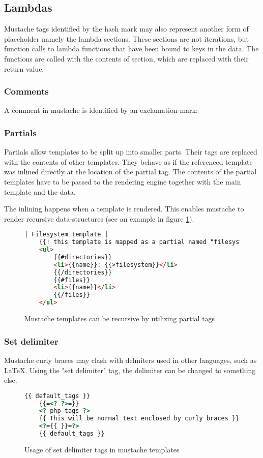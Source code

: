 \subsection{Lambdas}
Mustache tags identified by the hash mark may also represent another form of
placeholder namely the lambda sections. These sections are not iterations, but
function calls to lambda functions that have been bound to keys in the data.
The functions are called with the contents of section, which are replaced
with their return value.

\subsubsection{Comments}
A comment in mustache is identified by an exclamation mark:

\subsubsection{Partials}
Partials allow templates to be split up into smaller parts. Their tags are
replaced with the contents of other templates. They behave as if the referenced
template was inlined directly at the location of the partial tag.
The contents of the partial templates have to be passed to the rendering engine
together with the main template and the data.

The inlining happens when a template is rendered. This enables mustache to
render recursive data-structures
(see an example in figure \ref{fig:partial-example.mustache}).
\begin{figure}
	\label{fig:partial-example.mustache}
	\centering
	\caption{Mustache templates can be recursive by utilizing partial tags}
	\begin{lstlisting}[language=HTML]
	| Filesystem template |
	{{! this template is mapped as a partial named "filesystem" }}
	<ul>
		{{#directories}}
		<li>{{name}}: {{>filesystem}}</li>
		{{/directories}}
		{{#files}}
		<li>{{name}}</li>
		{{/files}}
	</ul>
	\end{lstlisting}
\end{figure}

\subsubsection{Set delimiter}
Mustache curly braces may clash with delmiters used in other languages,
such as LaTeX. Using the "set delimiter" tag, the delimiter can be changed to
something else.
\begin{figure}
	\label{fig:set-delim-example.mustache}
	\centering
	\caption{Usage of set delimiter tags in mustache templates}
	\begin{lstlisting}[language=HTML]
	{{ default_tags }}
	{{=<? ?>=}}
	<? php_tags ?>
	{{ This will be normal text enclosed by curly braces }}
	<?={{ }}=?>
	{{ default_tags }}
	\end{lstlisting}
\end{figure}

